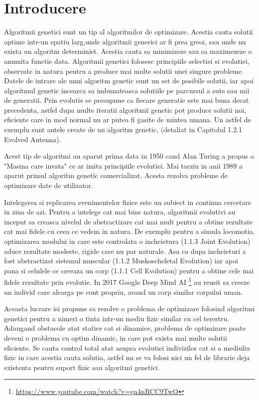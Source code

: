 \chapter*{Introducere} 

Algoritmii genetici sunt un tip al algoritmilor de optimizare. Acestia cauta solutii optime intr-un spatiu larg,unde algoritmii generici ar fi prea greoi, sau unde nu exista un algoritm determinist. Acestia cauta sa minimizeze sau sa maximezeze o anumita functie data. Algoritmii genetici folosesc principiile selectiei si evolutiei, observate in natura pentru a produce mai multe solutii unei singure probleme. Datele de intrare ale unui algoritm genetic sunt un set de posibile solutii, iar apoi algoritmul genetic incearca sa imbunateasca solutiile pe parcursul a sute sau mii de generatii. Prin evolutie se presupune ca fiecare generatie este mai buna decat precedenta, astfel dupa multe iteratii algoritmii genetic pot produce solutii noi, eficiente care in mod normal nu ar putea fi gasite de mintea umana. Un astfel de exemplu sunt antele create de un algoritm genetic, (detaliat in Capitolul 1.2.1 Evolved Antenna).

Acest tip de algoritmi au aparut prima data in 1950 cand Alan Turing a propus o "Masina care invata" ce ar imita principiile evolutiei. Mai tarziu in anii 1989 a aparut primul algoritm genetic comercializat. Acesta rezolva probleme de optimizare date de utilizator.

Intelegerea si replicarea evenimentelor fizice este un subiect in continua cercetare in ziua de azi. Pentru a intelege cat mai bine natura, algoritmii evolutivi au inceput sa creasca nivelul de abstractizare cat mai mult pentru a obtine rezultate cat mai fidele cu ceea ce vedem in natura. De exemplu pentru a simula locomotia, optimizarea modului in care este controlata o incheietura (1.1.3 Joint Evolution) aduce rezultate modeste, rigide care nu par naturale. Asa ca dupa incheieturi a fost abstractizat sistemul muscular (1.1.2 Muskoscheletal Evolution) iar apoi pana si celulele ce creeaza un corp (1.1.1 Cell Evolution) pentru a obtine cele mai fidele rezultate prin evolutie. In 2017 Google Deep Mind AI \footnote{\url{https://www.youtube.com/watch?v=gn4nRCC9TwQ}} au reusit sa creeze un individ care alearga pe cont propriu, avand un corp similar corpului uman.

Aceasta lucrare isi propune sa rezolve o problema de optimizare folosind algoritmi genetici pentru a nimeri o tinta intr-un mediu fizic similar cu cel terestru. Adaugand obstacole atat statice cat si dinamice, problema de optimizare poate deveni o problema cu optim dinamic, in care pot exista mai multe solutii eficiente. Se cauta control total atat asupra evolutiei indivizilor cat si a mediuliu fizic in care acestia cauta solutia, astfel nu se va folosi nici un fel de librarie deja existenta pentru suport fizic sau algoritmi genetici. 

